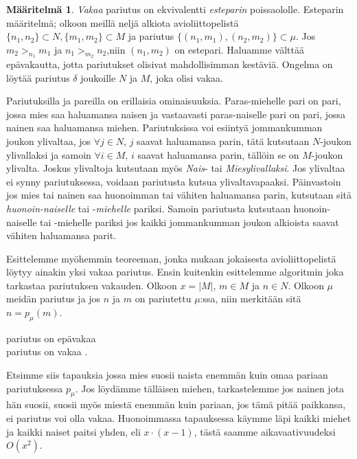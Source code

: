 \documentclass[finnish]{tktltiki2}
\theoremstyle{definition}
\newtheorem{maar}[lau]{Määritelmä}
\theoremstyle{remark}
\begin{document}
\begin{maar}
\emph{Vakaa} pariutus on ekvivalentti \emph{esteparin} poissaololle. Esteparin määritelmä; olkoon meillä neljä alkiota avioliittopelistä $\{n_1, n_2\} \subset N, \{m_1, m_2\} \subset M$ ja pariutus $\{(n_1, m_1), (n_2, m_2)\} \subset \mu$. Jos $m_2 >_{n_1} m_1$ ja $n_1 >_{m_2} n_2$,niin $(n_1, m_2)$ on estepari. Haluamme välttää epävakautta, jotta pariutukset olisivat mahdollisimman kestäviä. Ongelma on löytää pariutus $\delta$ joukoille $N$ ja $M$, joka olisi vakaa.
\end{maar}
Pariutuksilla ja pareilla on erillaisia ominaisuuksia. Paras-miehelle pari on pari, jossa mies saa haluamansa naisen ja vastaavasti paras-naiselle pari on pari, jossa nainen saa haluamansa miehen. Pariutuksissa voi esiintyä jommankumman joukon ylivaltaa, jos $\forall j \in N$, $j$ saavat haluamansa parin, tätä kutsutaan $N$-joukon ylivallaksi ja samoin $\forall i \in M$, $i$ saavat haluamansa parin, tällöin se on $M$-joukon ylivalta. Joskus ylivaltoja kutsutaan myös \emph{Nais}- tai \emph{Miesylivallaksi}. Jos ylivaltaa ei synny pariutuksessa, voidaan pariutusta kutsua ylivaltavapaaksi.
Päinvastoin jos mies tai nainen saa huonoimman tai vähiten haluamansa parin, kutsutaan sitä \emph{huonoin-naiselle} tai -\emph{miehelle} pariksi. Samoin pariutusta kutsutaan huonoin-naiselle tai -miehelle pariksi jos kaikki jommankumman joukon alkioista saavat vähiten haluamansa parit.

Esittelemme myöhemmin teoreeman, jonka mukaan jokaisesta avioliittopelistä löytyy ainakin yksi vakaa pariutus. Ensin kuitenkin esittelemme algoritmin joka tarkastaa pariutuksen vakauden.
Olkoon $x = |M|$, $m \in M$ ja $n \in N$. Olkoon $\mu$ meidän pariutus ja jos $n$ ja $m$ on pariutettu $\mu$:ssa, niin merkitään sitä $n = p_\mu(m)$.
\begin{algorithmic}
				\State \Return pariutus on epävakaa
			\EndIf
		\EndFor
	\EndFor\\
	\Return pariutus on vakaa
	\cite[p. 8]{gusfield1989stable}.
\end{algorithmic}

Etsimme siis tapauksia jossa mies suosii naista enemmän kuin omaa pariaan pariutuksessa $p_\mu$.
Jos löydämme tälläisen miehen, tarkastelemme jos nainen jota hän suosii, suosii myös miestä enemmän kuin pariaan, jos tämä pitää paikkansa, ei pariutus voi olla vakaa.
Huonoimmassa tapauksessa käymme läpi kaikki miehet ja kaikki naiset paitsi yhden, eli $x\cdot(x-1)$, tästä saamme aikavaativuudeksi $O(x^2)$.


%
%
% 
%



\end{document}
